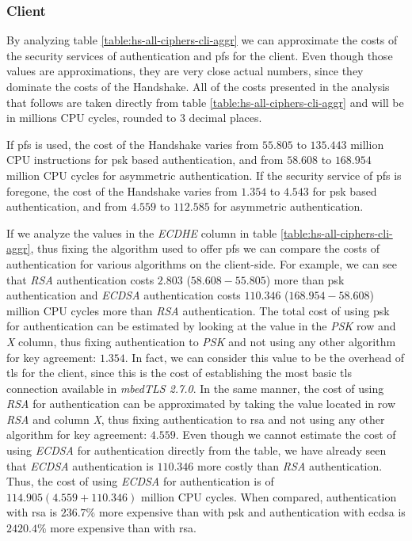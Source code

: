 \documentclass{llncs}
\begin{document}
\subsubsection{Client}

By analyzing table \ref{table:hs-all-ciphers-cli-aggr}  we can approximate
the costs of the security services of authentication and \gls{pfs} for the client. Even though those values are approximations,
they are very close actual numbers, since they dominate the costs of the Handshake. All of the costs presented in the 
analysis that follows are taken directly from table \ref{table:hs-all-ciphers-cli-aggr} and will be in millions CPU cycles,
rounded to $3$ decimal places.

If \gls{pfs} is used, the cost of the Handshake varies from $55.805$ to $135.443$
million CPU instructions for \gls{psk} based authentication, and from $58.608$ to $168.954$ million CPU cycles for
asymmetric authentication. If the security service of \gls{pfs} is foregone, the cost
of the Handshake varies from $1.354$ to $4.543$ for \gls{psk} based authentication,
and from $4.559$ to $112.585$ for asymmetric authentication.

If we analyze the values in the \textit{ECDHE} column in table \ref{table:hs-all-ciphers-cli-aggr}, thus fixing the
algorithm used to offer \gls{pfs} we can compare the costs of authentication for various algorithms on the client-side.
For example, we can see that \textit{RSA} authentication costs $2.803$  ($58.608 - 55.805$)
more than \gls{psk} authentication and \textit{ECDSA} authentication costs $110.346$ ($168.954 - 58.608$)
million CPU cycles more than
\textit{RSA} authentication. The total cost of using \gls{psk} for authentication can be estimated by looking at the
value in the \textit{PSK} row and \textit{X} column, thus fixing authentication to \textit{PSK} and not using any other
algorithm for key agreement: $1.354$. In fact, we can consider this value to be the overhead of \gls{tls} for the client,
since this is the cost of establishing the most basic \gls{tls} connection available in \textit{mbedTLS 2.7.0}.
In the same manner, the cost of using \textit{RSA} for authentication can
be approximated by taking the value located in row \textit{RSA} and column \textit{X}, thus fixing authentication
to \gls{rsa} and not using any other algorithm for key agreement: $4.559$. Even though we cannot estimate the cost
of using \textit{ECDSA} for authentication directly from the table, we have already seen that \textit{ECDSA} authentication
is $110.346$ more costly than \textit{RSA} authentication. Thus, the cost of using \textit{ECDSA} for authentication
is of $114.905 (4.559+110.346)$ million CPU cycles. When compared, authentication with \gls{rsa} is
$236.7\%$ more expensive than with \gls{psk} and authentication with \gls{ecdsa} is $2420.4\%$ more
expensive than with \gls{rsa}.
\end{document}
